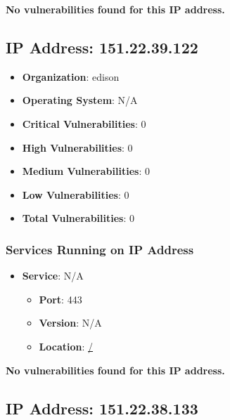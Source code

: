 \documentclass{article}
\begin{document}
\textbf{No vulnerabilities found for this IP address.}




\clearpage



\subsection{IP Address: 151.22.39.122}

\begin{itemize}
    \item \textbf{Organization}: edison
    \item \textbf{Operating System}:  N/A 
    \item \textbf{Critical Vulnerabilities}: 0
    \item \textbf{High Vulnerabilities}: 0
    \item \textbf{Medium Vulnerabilities}: 0
    \item \textbf{Low Vulnerabilities}: 0
    \item \textbf{Total Vulnerabilities}: 0
\end{itemize}

\subsubsection*{Services Running on IP Address}

\begin{itemize}
    
        \item \textbf{Service}: N/A
        \begin{itemize}
            \item \textbf{Port}: 443
            \item \textbf{Version}:  N/A 
            \item \textbf{Location}: \href{ / }{ / }
        \end{itemize}
    
\end{itemize}


\textbf{No vulnerabilities found for this IP address.}




\clearpage



\subsection{IP Address: 151.22.38.133}
\end{document}
